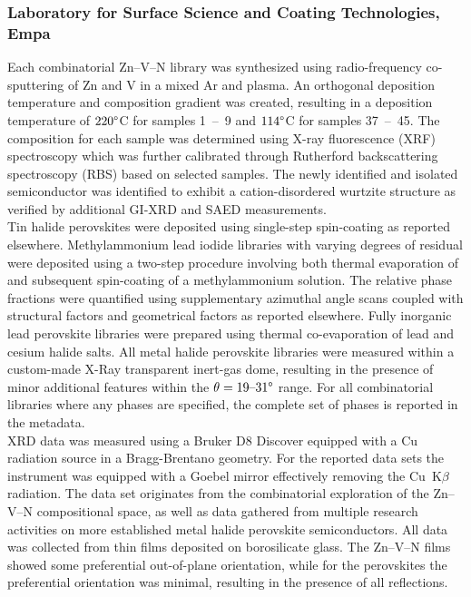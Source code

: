 \subsubsection*{Laboratory for Surface Science and Coating Technologies, Empa}

Each combinatorial Zn–V–N library was synthesized using radio-frequency co-sputtering of Zn and V in a mixed Ar and  plasma. An orthogonal deposition temperature and composition gradient was created, resulting in a deposition temperature of $220\degree$C for samples 1~–~9 and $114\degree$C for samples 37~–~45. The composition for each sample was determined using X-ray fluorescence (XRF) spectroscopy which was further calibrated through Rutherford backscattering spectroscopy (RBS) based on selected samples. The newly identified and isolated semiconductor  was identified to exhibit a cation-disordered wurtzite structure as verified by additional GI-XRD and SAED measurements\cite{Zhuk2021}. \\
Tin halide perovskites were deposited using single-step spin-coating as reported elsewhere\cite{Wieczorek2023}. Methylammonium lead iodide libraries with varying degrees of residual  were deposited using a two-step procedure involving both thermal evaporation of  and subsequent spin-coating of a methylammonium solution. The relative phase fractions were quantified using supplementary azimuthal angle scans coupled with structural factors and geometrical factors as reported elsewhere\cite{Wieczorek2024}. Fully inorganic lead perovskite libraries were prepared using thermal co-evaporation of lead and cesium halide salts.
All metal halide perovskite libraries were measured within a custom-made X-Ray transparent inert-gas dome, resulting in the presence of minor additional features within the $\theta=19 \text{–}31\degree$ range. For all combinatorial libraries where any phases are specified, the complete set of phases is reported in the metadata. \\

XRD data was measured using a Bruker D8 Discover equipped with a Cu radiation source in a Bragg-Brentano geometry. For the reported data sets the instrument was equipped with a Goebel mirror effectively removing the Cu~K$\beta$ radiation. The data set originates from the combinatorial exploration of the Zn–V–N compositional space, as well as data gathered from multiple research activities on more established metal halide perovskite semiconductors. All data was collected from thin films deposited on borosilicate glass. The Zn–V–N films showed some preferential out-of-plane orientation, while for the perovskites the preferential orientation was minimal, resulting in the presence of all reflections. \\



